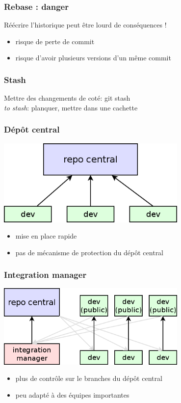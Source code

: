 \begin{frame}\frametitle{Rebase : danger}
Réécrire l'historique peut être lourd de conséquences !
\begin{itemize}
  \item risque de perte de commit
  \item risque d'avoir plusieurs versions d'un même commit
\end{itemize}

\end{frame}
\begin{frame}[fragile]\frametitle{Stash}
  Mettre des changements de coté: \alert{git stash}\\
\textit{to stash}: planquer, mettre dans une cachette
\end{frame}
\begin{frame}\frametitle{Dépôt central}
  \begin{center}
    \includegraphics[width=0.7\textwidth]{./images/repo_central.png}
  \end{center}
  \begin{itemize}
    \item mise en place rapide
    \item pas de mécanisme de protection du dépôt central
  \end{itemize}

\end{frame}
\begin{frame}\frametitle{Integration manager}
  \begin{center}
    \includegraphics[width=0.7\textwidth]{./images/integration_manager.png}
  \end{center}
  \begin{itemize}
    \item plus de contrôle sur le branches du dépôt central
    \item peu adapté à des équipes importantes
  \end{itemize}

\end{frame}
